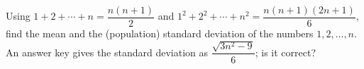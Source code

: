 Using $1+2+\cdots+n=\dfrac{n(n+1)}{2}$ and $1^2+2^2+\cdots+n^2=\dfrac{n(n+1)(2n+1)}{6}$, find the mean and the (population) standard deviation of the numbers $1,2,\dots,n$. An answer key gives the standard deviation as $\dfrac{\sqrt{3n^2-9}}{6}$; is it correct?
